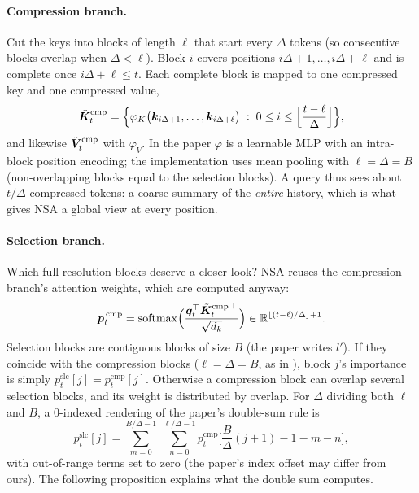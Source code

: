 \paragraph{Compression branch.}
Cut the keys into blocks of length $\ell$ that start every $\Delta$ tokens (so consecutive blocks
overlap when $\Delta<\ell$). Block $i$ covers positions $i\Delta+1,\dots,i\Delta+\ell$ and is
complete once $i\Delta+\ell\le t$. Each complete block is mapped to one compressed key and one
compressed value,
\begin{equation}\label{eq:c04-nsa-cmp}
  \tilde{\bm{K}}^{\mathrm{cmp}}_t=\Big\{\varphi_K\big(\bm{k}_{i\Delta+1},\dots,\bm{k}_{i\Delta+\ell}\big)\;:\;
  0\le i\le\Big\lfloor\frac{t-\ell}{\Delta}\Big\rfloor\Big\},
\end{equation}
and likewise $\tilde{\bm{V}}^{\mathrm{cmp}}_t$ with $\varphi_V$. In the paper $\varphi$ is a learnable
MLP with an intra-block position encoding; the \fla{} implementation uses mean pooling with
$\ell=\Delta=B$ (non-overlapping blocks equal to the selection blocks). A query thus sees about
$t/\Delta$ compressed tokens: a coarse summary of the \emph{entire} history, which is what gives
NSA a global view at every position.

\paragraph{Selection branch.}
Which full-resolution blocks deserve a closer look? NSA reuses the compression branch's
attention weights, which are computed anyway:
\begin{equation}\label{eq:c04-nsa-pcmp}
  \bm{p}^{\,\mathrm{cmp}}_t=\operatorname{softmax}\!\Big(\frac{\bm{q}_t^{\top}\tilde{\bm{K}}^{\mathrm{cmp}\,\top}_t}{\sqrt{d_k}}\Big)\in\mathbb{R}^{\lfloor (t-\ell)/\Delta\rfloor+1}.
\end{equation}
Selection blocks are contiguous blocks of size $B$ (the paper writes $l'$). If they coincide
with the compression blocks ($\ell=\Delta=B$, as in \fla), block $j$'s importance is simply
$p^{\mathrm{slc}}_t[j]=p^{\mathrm{cmp}}_t[j]$. Otherwise a compression block can overlap several
selection blocks, and its weight is distributed by overlap. For $\Delta$ dividing both $\ell$ and
$B$, a 0-indexed rendering of the paper's double-sum rule is
\begin{equation}\label{eq:c04-nsa-map}
  p^{\mathrm{slc}}_t[j]=\sum_{m=0}^{B/\Delta-1}\;\sum_{n=0}^{\ell/\Delta-1}
  p^{\mathrm{cmp}}_t\Big[\frac{B}{\Delta}(j+1)-1-m-n\Big],
\end{equation}
with out-of-range terms set to zero (the paper's index offset may differ from ours). The
following proposition explains what the double sum computes.

